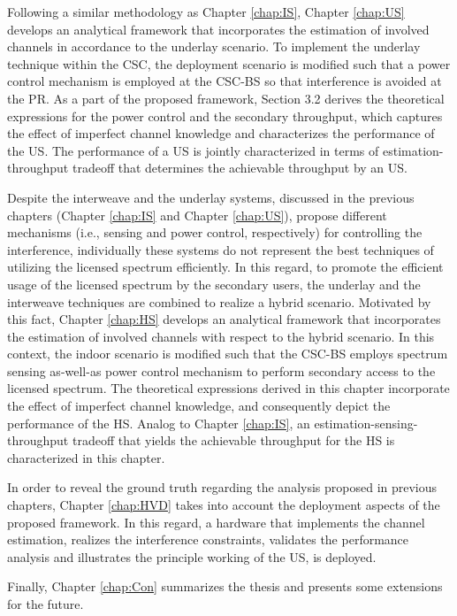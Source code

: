 Following a similar methodology as Chapter \ref{chap:IS}, Chapter \ref{chap:US} develops an analytical framework that incorporates the estimation of involved channels in accordance to the underlay scenario. To implement the underlay technique within the CSC, the deployment scenario is modified such that a power control mechanism is employed at the CSC-BS so that interference is avoided at the PR. As a part of the proposed framework, Section 3.2 derives the theoretical expressions for the power control and the secondary throughput, which captures the effect of imperfect channel knowledge and characterizes the performance of the US. The performance of a US is jointly characterized in terms of estimation-throughput tradeoff that determines the achievable throughput by an US. 

Despite the interweave and the underlay systems, discussed in the previous chapters (Chapter \ref{chap:IS} and Chapter \ref{chap:US}), propose different mechanisms (i.e., sensing and power control, respectively) for controlling the interference, individually these systems do not represent the best techniques of utilizing the licensed spectrum efficiently. In this regard, to promote the efficient usage of the licensed spectrum by the secondary users, the underlay and the interweave techniques are combined to realize a hybrid scenario. Motivated by this fact, Chapter \ref{chap:HS} develops an analytical framework that incorporates the estimation of involved channels with respect to the hybrid scenario. In this context, the indoor scenario is modified such that the CSC-BS employs spectrum sensing as-well-as power control mechanism to perform secondary access to the licensed spectrum. The theoretical expressions derived in this chapter incorporate the effect of imperfect channel knowledge, and consequently depict the performance of the HS. Analog to Chapter \ref{chap:IS}, an estimation-sensing-throughput tradeoff that yields the achievable throughput for the HS is characterized in this chapter. 

 
In order to reveal the ground truth regarding the analysis proposed in previous chapters, Chapter \ref{chap:HVD} takes into account the deployment aspects of the proposed framework. In this regard, a hardware that implements the channel estimation, realizes the interference constraints, validates the performance analysis and illustrates the principle working of the US, is deployed.   

Finally, Chapter \ref{chap:Con} summarizes the thesis and presents some extensions for the future. 
